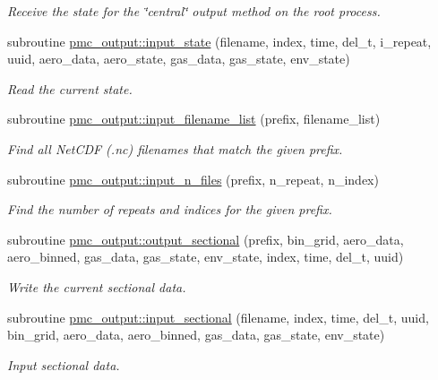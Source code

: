 \begin{DoxyCompactItemize}
\begin{DoxyCompactList}\small\item\em Receive the state for the \char`\"{}central\char`\"{} output method on the root process. \end{DoxyCompactList}\item 
subroutine \mbox{\hyperlink{namespacepmc__output_a2ff47cdec429fe8017c81142579dbf01}{pmc\+\_\+output\+::input\+\_\+state}} (filename, index, time, del\+\_\+t, i\+\_\+repeat, uuid, aero\+\_\+data, aero\+\_\+state, gas\+\_\+data, gas\+\_\+state, env\+\_\+state)
\begin{DoxyCompactList}\small\item\em Read the current state. \end{DoxyCompactList}\item 
subroutine \mbox{\hyperlink{namespacepmc__output_ae4a4e34f6d1c462b463d453659adc2c6}{pmc\+\_\+output\+::input\+\_\+filename\+\_\+list}} (prefix, filename\+\_\+list)
\begin{DoxyCompactList}\small\item\em Find all Net\+C\+DF (.nc) filenames that match the given prefix. \end{DoxyCompactList}\item 
subroutine \mbox{\hyperlink{namespacepmc__output_ac7e633e29c4be7b105c968977e1ea3eb}{pmc\+\_\+output\+::input\+\_\+n\+\_\+files}} (prefix, n\+\_\+repeat, n\+\_\+index)
\begin{DoxyCompactList}\small\item\em Find the number of repeats and indices for the given prefix. \end{DoxyCompactList}\item 
subroutine \mbox{\hyperlink{namespacepmc__output_aaeb4ae95909c840a46222d7a1183014c}{pmc\+\_\+output\+::output\+\_\+sectional}} (prefix, bin\+\_\+grid, aero\+\_\+data, aero\+\_\+binned, gas\+\_\+data, gas\+\_\+state, env\+\_\+state, index, time, del\+\_\+t, uuid)
\begin{DoxyCompactList}\small\item\em Write the current sectional data. \end{DoxyCompactList}\item 
subroutine \mbox{\hyperlink{namespacepmc__output_aa408179ae00883a023ad1087057b01ef}{pmc\+\_\+output\+::input\+\_\+sectional}} (filename, index, time, del\+\_\+t, uuid, bin\+\_\+grid, aero\+\_\+data, aero\+\_\+binned, gas\+\_\+data, gas\+\_\+state, env\+\_\+state)
\begin{DoxyCompactList}\small\item\em Input sectional data. \end{DoxyCompactList}\end{DoxyCompactItemize}
